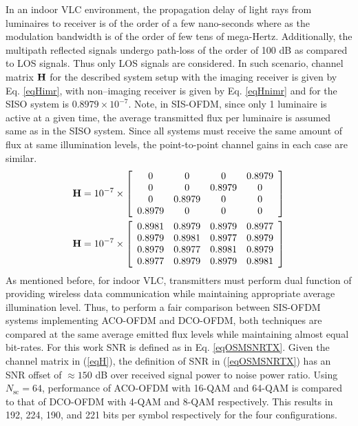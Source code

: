 In an indoor VLC environment, the propagation delay of light rays from luminaires to receiver is of the order of a few nano-seconds where as the modulation bandwidth is of the order of few tens of mega-Hertz. Additionally, the multipath reflected signals undergo path-loss of the order of 100 dB as compared to LOS signals. Thus only LOS signals are considered. In such scenario, channel matrix ${\bf{H}}$ for the described system setup with the imaging receiver is given by Eq. \eqref{eqHimr}, with non--imaging receiver is given by Eq. \eqref{eqHnimr} and for the SISO system is $0.8979\times 10^{-7}$. Note, in SIS-OFDM, since only 1 luminaire is active at a given time, the average transmitted flux per luminaire is assumed same as in the SISO system. Since all systems must receive the same amount of flux at same illumination levels, the point-to-point channel gains in each case are similar.
\begin{subequations}
\begin{align}
	{\bf{H}} = 10^{-7}\times\left[
	                      \begin{array}{cccc}
												0&0&0&0.8979\\
												0&0&0.8979&0\\
												0&0.8979&0&0\\
												0.8979&0&0&0
												\end{array}
												\right]\label{eqHimr}\\
	{\bf{H}} = 10^{-7}\times\left[
	                      \begin{array}{cccc}
												0.8981&0.8979&0.8979&0.8977\\
												0.8979&0.8981&0.8977&0.8979\\
												0.8979&0.8977&0.8981&0.8979\\
												0.8977&0.8979&0.8979&0.8981
												\end{array}
												\right]\label{eqHnimr}
\end{align}
\label{eqH}
\end{subequations}
As mentioned before, for indoor VLC, transmitters must perform dual function of providing wireless data communication while maintaining appropriate average illumination level. Thus, to perform a fair comparison between SIS-OFDM systems implementing ACO-OFDM and DCO-OFDM, both techniques are compared at the same average emitted flux levels while maintaining almost equal bit-rates. For this work SNR is defined as in Eq. \eqref{eqOSMSNRTX}. Given the channel matrix in (\ref{eqH}), the definition of SNR in (\ref{eqOSMSNRTX}) has an SNR offset of $\approx 150$ dB over received signal power to noise power ratio. Using $N_{\text{sc}}=64$, performance of ACO-OFDM with 16-QAM and 64-QAM is compared to that of DCO-OFDM with 4-QAM and 8-QAM respectively. This results in 192, 224, 190, and 221 bits per symbol respectively for the four configurations.

